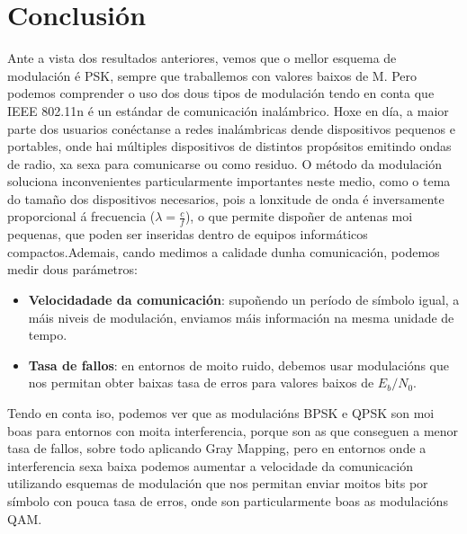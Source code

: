 \documentclass[
	10pt, %
	spanish, %
]{fphw}
\begin{document}
\section*{Conclusión}
Ante a vista dos resultados anteriores, vemos que o mellor esquema de modulación é PSK, sempre que traballemos con valores baixos de M. Pero podemos comprender o uso dos dous tipos de modulación tendo en conta que IEEE 802.11n é un estándar de comunicación inalámbrico. Hoxe en día, a maior parte dos usuarios conéctanse a redes inalámbricas dende dispositivos pequenos e portables, onde hai múltiples dispositivos de distintos propósitos emitindo ondas de radio, xa sexa para comunicarse ou como residuo. O método da modulación soluciona inconvenientes particularmente importantes neste medio, como o tema do tamaño dos dispositivos necesarios, pois a lonxitude de onda é inversamente proporcional á frecuencia ($\lambda = \frac{c}{f}$), o que permite dispoñer de antenas moi pequenas, que poden ser inseridas dentro de equipos informáticos compactos.\newline Ademais, cando medimos a calidade dunha comunicación, podemos medir dous parámetros:
\begin{itemize}
\item \textbf{Velocidadade da comunicación}: supoñendo un período de símbolo igual, a máis niveis de modulación, enviamos máis información na mesma unidade de tempo.
\item \textbf{Tasa de fallos}: en entornos de moito ruido, debemos usar modulacións que nos permitan obter baixas tasa de erros para valores baixos de $E_b/N_0$.
\end{itemize}
Tendo en conta iso, podemos ver que as modulacións BPSK e QPSK son moi boas para entornos con moita interferencia, porque son as que conseguen a menor tasa de fallos, sobre todo aplicando Gray Mapping, pero en entornos onde a interferencia sexa baixa podemos aumentar a velocidade da comunicación utilizando esquemas de modulación que nos permitan enviar moitos bits por símbolo con pouca tasa de erros, onde son particularmente boas as modulacións QAM. 
\end{document}
